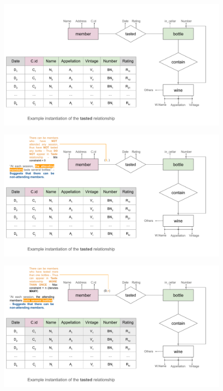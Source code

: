 \documentclass{beamer}
\begin{document}
\begin{frame}
    \begin{figure}
        \centering
        \includegraphics[width=1.1\linewidth]{tut_02_files/10.pdf}
    \end{figure}
\end{frame}

\begin{frame}
    \begin{figure}
        \centering
        \includegraphics[width=1.1\linewidth]{tut_02_files/11.pdf}
    \end{figure}
\end{frame}

\begin{frame}
    \begin{figure}
        \centering
        \includegraphics[width=1.1\linewidth]{tut_02_files/12.pdf}
    \end{figure}
\end{frame}
\end{document}
